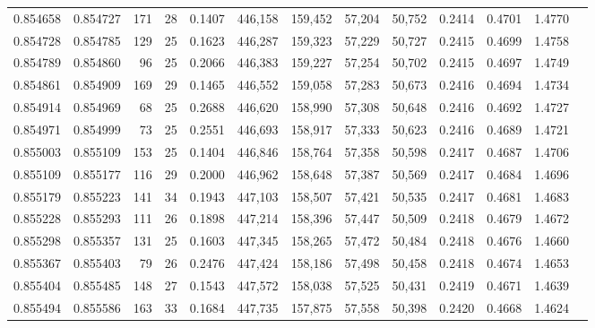 \begin{tabular}{rrrrrrrrrrrrr}
0.854658 & 0.854727 &   171 &  28 &                                     0.1407 & 446,158 & 159,452 &  57,204 &  50,752 & 0.2414 & 0.4701 & 1.4770 \\
0.854728 & 0.854785 &   129 &  25 &                                     0.1623 & 446,287 & 159,323 &  57,229 &  50,727 & 0.2415 & 0.4699 & 1.4758 \\
0.854789 & 0.854860 &    96 &  25 &                                     0.2066 & 446,383 & 159,227 &  57,254 &  50,702 & 0.2415 & 0.4697 & 1.4749 \\
0.854861 & 0.854909 &   169 &  29 &                                     0.1465 & 446,552 & 159,058 &  57,283 &  50,673 & 0.2416 & 0.4694 & 1.4734 \\
0.854914 & 0.854969 &    68 &  25 &                                     0.2688 & 446,620 & 158,990 &  57,308 &  50,648 & 0.2416 & 0.4692 & 1.4727 \\
0.854971 & 0.854999 &    73 &  25 &                                     0.2551 & 446,693 & 158,917 &  57,333 &  50,623 & 0.2416 & 0.4689 & 1.4721 \\
0.855003 & 0.855109 &   153 &  25 &                                     0.1404 & 446,846 & 158,764 &  57,358 &  50,598 & 0.2417 & 0.4687 & 1.4706 \\
0.855109 & 0.855177 &   116 &  29 &                                     0.2000 & 446,962 & 158,648 &  57,387 &  50,569 & 0.2417 & 0.4684 & 1.4696 \\
0.855179 & 0.855223 &   141 &  34 &                                     0.1943 & 447,103 & 158,507 &  57,421 &  50,535 & 0.2417 & 0.4681 & 1.4683 \\
0.855228 & 0.855293 &   111 &  26 &                                     0.1898 & 447,214 & 158,396 &  57,447 &  50,509 & 0.2418 & 0.4679 & 1.4672 \\
0.855298 & 0.855357 &   131 &  25 &                                     0.1603 & 447,345 & 158,265 &  57,472 &  50,484 & 0.2418 & 0.4676 & 1.4660 \\
0.855367 & 0.855403 &    79 &  26 &                                     0.2476 & 447,424 & 158,186 &  57,498 &  50,458 & 0.2418 & 0.4674 & 1.4653 \\
0.855404 & 0.855485 &   148 &  27 &                                     0.1543 & 447,572 & 158,038 &  57,525 &  50,431 & 0.2419 & 0.4671 & 1.4639 \\
0.855494 & 0.855586 &   163 &  33 &                                     0.1684 & 447,735 & 157,875 &  57,558 &  50,398 & 0.2420 & 0.4668 & 1.4624 \\

\end{tabular}
